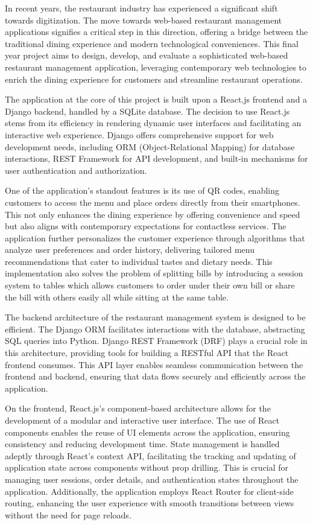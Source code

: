 In recent years, the restaurant industry has experienced a significant shift towards digitization. The move towards web-based restaurant management applications signifies a critical step in this direction, offering a bridge between the traditional dining experience and modern technological conveniences. This final year project aims to design, develop, and evaluate a sophisticated web-based restaurant management application, leveraging contemporary web technologies to enrich the dining experience for customers and streamline restaurant operations.

The application at the core of this project is built upon a React.js frontend and a Django backend, handled by a SQLite database. The decision to use React.js stems from its efficiency in rendering dynamic user interfaces and facilitating an interactive web experience. Django offers comprehensive support for web development needs, including ORM (Object-Relational Mapping) for database interactions, REST Framework for API development, and built-in mechanisms for user authentication and authorization.

One of the application's standout features is its use of QR codes, enabling customers to access the menu and place orders directly from their smartphones. This not only enhances the dining experience by offering convenience and speed but also aligns with contemporary expectations for contactless services. The application further personalizes the customer experience through algorithms that analyze user preferences and order history, delivering tailored menu recommendations that cater to individual tastes and dietary needs. This implementation also solves the problem of splitting bills by introducing a session system to tables which allows customers to order under their own bill or share the bill with others easily all while sitting at the same table.

The backend architecture of the restaurant management system is designed to be efficient. The Django ORM facilitates interactions with the database, abstracting SQL queries into Python. Django REST Framework (DRF) plays a crucial role in this architecture, providing tools for building a RESTful API that the React frontend consumes. This API layer enables seamless communication between the frontend and backend, ensuring that data flows securely and efficiently across the application.

On the frontend, React.js's component-based architecture allows for the development of a modular and interactive user interface. The use of React components enables the reuse of UI elements across the application, ensuring consistency and reducing development time. State management is handled adeptly through React's context API, facilitating the tracking and updating of application state across components without prop drilling. This is crucial for managing user sessions, order details, and authentication states throughout the application. Additionally, the application employs React Router for client-side routing, enhancing the user experience with smooth transitions between views without the need for page reloads.

